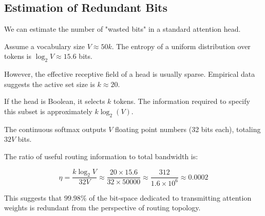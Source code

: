 \subsection{Estimation of Redundant Bits}






We can estimate the number of "wasted bits" in a standard attention head.






Assume a vocabulary size $V \approx 50k$. The entropy of a uniform distribution over tokens is $\log_2 V \approx 15.6$ bits.






However, the effective receptive field of a head is usually sparse. Empirical data suggests the active set size is $k \approx 20$.






If the head is Boolean, it selects $k$ tokens. The information required to specify this subset is approximately $k \log_2(V)$.






The continuous softmax outputs $V$ floating point numbers (32 bits each), totaling $32V$ bits.






The ratio of useful routing information to total bandwidth is:






$$






\eta = \frac{k \log_2 V}{32 V} \approx \frac{20 \times 15.6}{32 \times 50000} \approx \frac{312}{1.6 \times 10^6} \approx 0.0002






$$






This suggests that $99.98\%$ of the bit-space dedicated to transmitting attention weights is redundant from the perspective of routing topology.













